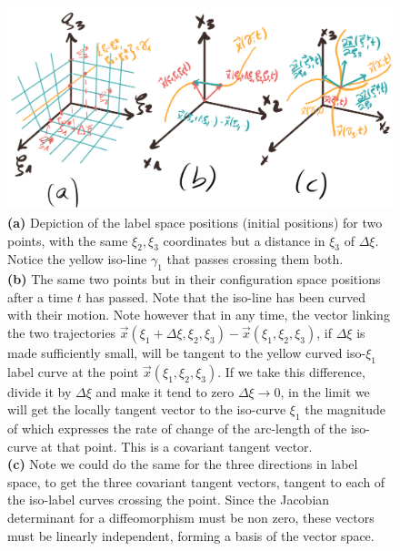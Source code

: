 \documentclass[11pt, a4paper]{article} %
\begin{document}
\begin{figure}[h!]
  \centering
    \includegraphics[width=0.75\linewidth]{3covariant_tangent_vectors.png}
  \caption{{\bf (a)} Depiction of the label space positions (initial positions) for two points, with the same $\xi_2, \xi_3$ coordinates but a distance in $\xi_3$ of $\Delta \xi$. Notice the yellow iso-line $\gamma_1$ that passes crossing them both.\\ {\bf (b)} The same two points but in their configuration space positions after a time $t$ has passed. Note that the iso-line has been curved with their motion. Note however that in any time, the vector linking the two trajectories $\vec{x}(\xi_1+\Delta\xi,\xi_2,\xi_3)-\vec{x}(\xi_1,\xi_2,\xi_3)$, if $\Delta \xi$ is made sufficiently small, will be tangent to the yellow curved iso-$\xi_1$ label curve at the point $\vec{x}(\xi_1,\xi_2,\xi_3)$. If we take this difference, divide it by $\Delta \xi$ and make it tend to zero $\Delta \xi\rightarrow 0$, in the limit we will get the locally tangent vector to the iso-curve $\xi_1$ the magnitude of which expresses the rate of change of the arc-length of the iso-curve at that point. This is a covariant tangent vector.\\ {\bf (c)} Note we could do the same for the three directions in label space, to get the three covariant tangent vectors, tangent to each of the iso-label curves crossing the point. Since the Jacobian determinant for a diffeomorphism must be non zero, these vectors must be linearly independent, forming a basis of the vector space. }
  \label{fig:covariant}
\end{figure}
\end{document}
